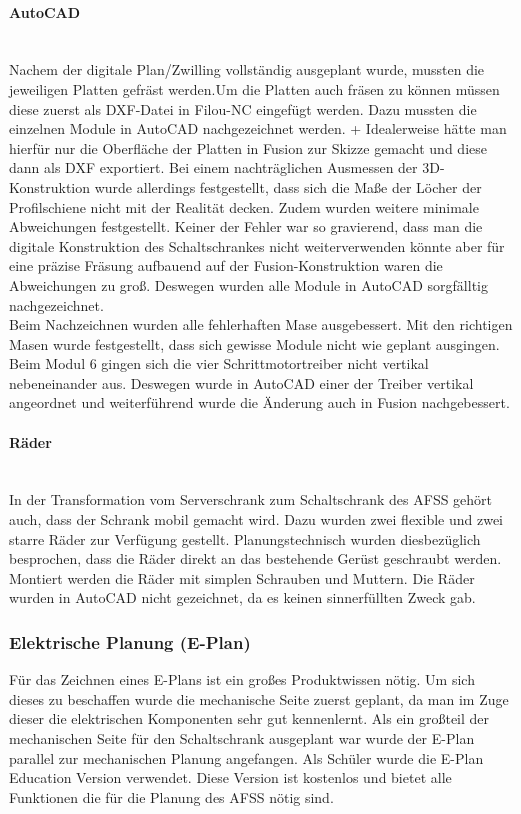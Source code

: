     \paragraph{AutoCAD}\mbox{}\\
    Nachem der digitale Plan/Zwilling vollständig ausgeplant wurde, mussten die jeweiligen Platten gefräst werden.Um die Platten auch fräsen zu können müssen diese zuerst als DXF-Datei in Filou-NC eingefügt werden. Dazu mussten die einzelnen Module in AutoCAD nachgezeichnet werden.     
+
    Idealerweise hätte man hierfür nur die Oberfläche der Platten in Fusion zur Skizze gemacht und diese dann als DXF exportiert. Bei einem nachträglichen Ausmessen der 3D-Konstruktion wurde allerdings festgestellt, dass sich die Maße der Löcher der Profilschiene nicht mit der Realität decken. Zudem wurden weitere minimale Abweichungen festgestellt. Keiner der Fehler war so gravierend, dass man die digitale Konstruktion des Schaltschrankes nicht weiterverwenden könnte aber für eine präzise Fräsung aufbauend auf der Fusion-Konstruktion waren die Abweichungen zu groß. Deswegen wurden alle Module in AutoCAD sorgfälltig nachgezeichnet.\\     
    Beim Nachzeichnen wurden alle fehlerhaften Mase ausgebessert. Mit den richtigen Masen wurde festgestellt, dass sich gewisse Module nicht wie geplant ausgingen. Beim Modul 6 gingen sich die vier Schrittmotortreiber nicht vertikal nebeneinander aus. Deswegen wurde in AutoCAD einer der Treiber vertikal angeordnet und weiterführend wurde die Änderung auch in Fusion nachgebessert.
    \paragraph{Räder}\mbox{}\\
    In der Transformation vom Serverschrank zum Schaltschrank des AFSS gehört auch, dass der Schrank mobil gemacht wird. Dazu wurden zwei flexible und zwei starre Räder zur Verfügung gestellt. Planungstechnisch wurden diesbezüglich besprochen, dass die Räder direkt an das bestehende Gerüst geschraubt werden. Montiert werden die Räder mit simplen Schrauben und Muttern. Die Räder wurden in AutoCAD nicht gezeichnet, da es keinen sinnerfüllten Zweck gab. 
\subsubsection{Elektrische Planung (E-Plan)}
    Für das Zeichnen eines E-Plans ist ein großes Produktwissen nötig. Um sich dieses zu beschaffen wurde die mechanische Seite zuerst geplant, da man im  Zuge dieser die elektrischen Komponenten sehr gut kennenlernt. Als ein großteil der mechanischen Seite für den Schaltschrank ausgeplant war wurde der E-Plan parallel zur mechanischen Planung angefangen. Als Schüler wurde die E-Plan Education Version verwendet. Diese Version ist kostenlos und bietet alle Funktionen die für die Planung des AFSS nötig sind.
